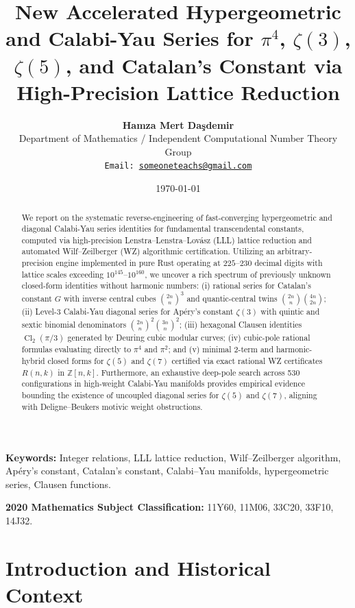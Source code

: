 \documentclass[11pt,a4paper]{article}
\title{\textbf{New Accelerated Hypergeometric and Calabi-Yau Series for $\pi^4$, $\zeta(3)$, $\zeta(5)$, and Catalan's Constant via High-Precision Lattice Reduction}}
\author{\textbf{Hamza Mert Daşdemir}\\[0.5em]
\small Department of Mathematics / Independent Computational Number Theory Group\\
\small \texttt{Email: \href{mailto:someoneteachs@gmail.com}{someoneteachs@gmail.com}}
}
\date{\today}
\theoremstyle{definition}
\DeclareMathOperator{\Cl}{Cl}
\begin{document}
\maketitle

\begin{abstract}
We report on the systematic reverse-engineering of fast-converging hypergeometric and diagonal Calabi-Yau series identities for fundamental transcendental constants, computed via high-precision Lenstra--Lenstra--Lov\'asz (LLL) lattice reduction and automated Wilf--Zeilberger (WZ) algorithmic certification. Utilizing an arbitrary-precision engine implemented in pure Rust operating at $225$--$230$ decimal digits with lattice scales exceeding $10^{145}$--$10^{160}$, we uncover a rich spectrum of previously unknown closed-form identities without harmonic numbers:
(i) rational series for Catalan's constant $G$ with inverse central cubes $\binom{2n}{n}^3$ and quantic-central twins $\binom{2n}{n}\binom{4n}{2n}$;
(ii) Level-3 Calabi-Yau diagonal series for Ap\'ery's constant $\zeta(3)$ with quintic and sextic binomial denominators $\binom{2n}{n}^2\binom{3n}{n}^2$;
(iii) hexagonal Clausen identities $\Cl_2(\pi/3)$ generated by Deuring cubic modular curves;
(iv) cubic-pole rational formulas evaluating directly to $\pi^4$ and $\pi^2$; and
(v) minimal 2-term and harmonic-hybrid closed forms for $\zeta(5)$ and $\zeta(7)$ certified via exact rational WZ certificates $R(n, k)$ in $\mathbb{Z}[n, k]$. 
Furthermore, an exhaustive deep-pole search across 530 configurations in high-weight Calabi-Yau manifolds provides empirical evidence bounding the existence of uncoupled diagonal series for $\zeta(5)$ and $\zeta(7)$, aligning with Deligne--Beukers motivic weight obstructions.
\end{abstract}

\vspace{0.5em}
\noindent\textbf{Keywords:} Integer relations, LLL lattice reduction, Wilf--Zeilberger algorithm, Ap\'ery's constant, Catalan's constant, Calabi--Yau manifolds, hypergeometric series, Clausen functions.

\vspace{0.5em}
\noindent\textbf{2020 Mathematics Subject Classification:} 11Y60, 11M06, 33C20, 33F10, 14J32.

\tableofcontents
\newpage

\section{Introduction and Historical Context}
\end{document}
